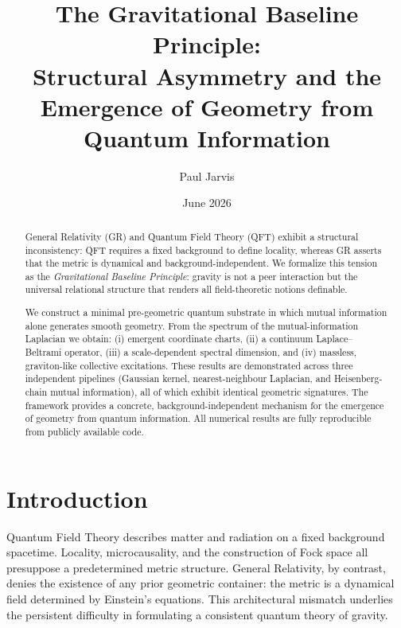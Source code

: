 \documentclass[aps,prd,twocolumn,nofootinbib,superscriptaddress]{revtex4-2}
\begin{document}
\title{The Gravitational Baseline Principle:\\
Structural Asymmetry and the Emergence of Geometry from Quantum Information}

\author{Paul Jarvis}

\date{June 2026}

\begin{abstract}
General Relativity (GR) and Quantum Field Theory (QFT) exhibit a structural inconsistency: QFT requires a fixed background to define locality, whereas GR asserts that the metric is dynamical and background-independent. We formalize this tension as the \emph{Gravitational Baseline Principle}: gravity is not a peer interaction but the universal relational structure that renders all field-theoretic notions definable.

We construct a minimal pre-geometric quantum substrate in which mutual information alone generates smooth geometry. From the spectrum of the mutual-information Laplacian we obtain: (i) emergent coordinate charts, (ii) a continuum Laplace--Beltrami operator, (iii) a scale-dependent spectral dimension, and (iv) massless, graviton-like collective excitations. These results are demonstrated across three independent pipelines (Gaussian kernel, nearest-neighbour Laplacian, and Heisenberg-chain mutual information), all of which exhibit identical geometric signatures. The framework provides a concrete, background-independent mechanism for the emergence of geometry from quantum information. All numerical results are fully reproducible from publicly available code.
\end{abstract}

\maketitle

\section{Introduction}

Quantum Field Theory describes matter and radiation on a fixed background spacetime. Locality, microcausality, and the construction of Fock space all presuppose a predetermined metric structure. General Relativity, by contrast, denies the existence of any prior geometric container: the metric is a dynamical field determined by Einstein's equations. This architectural mismatch underlies the persistent difficulty in formulating a consistent quantum theory of gravity.
\end{document}
